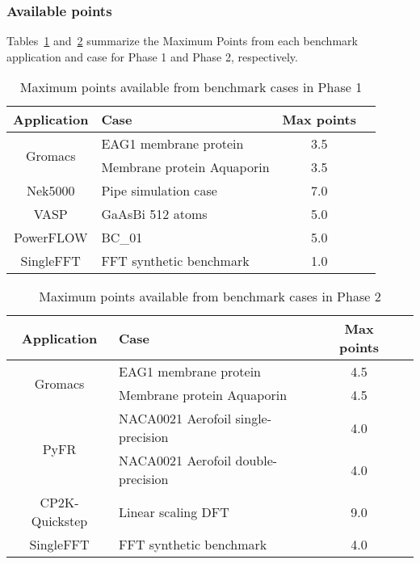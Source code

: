 \documentclass{article}
\begin{document}
\subsubsection*{Available points}

Tables~\ref{tab:points1} and~\ref{tab:points2} summarize the Maximum Points from each benchmark application and case for Phase 1 and Phase 2, respectively.

\begin{table}[h]
\begin{center}
\caption{Maximum points available from benchmark cases in Phase 1}
\label{tab:points1}
\begin{tabular}{cp{6cm}cc}
\hline\hline
\textbf{Application} & \textbf{Case} & \textbf{Max points}\\
\hline
\multirow{2}{*}{Gromacs}&EAG1 membrane protein&3.5\\
& Membrane protein Aquaporin & 3.5 \\ \hline
Nek5000 & Pipe simulation case & 7.0 \\ \hline
VASP & GaAsBi 512 atoms & 5.0 \\ \hline
PowerFLOW & BC\_01 & 5.0 \\ \hline
SingleFFT & FFT synthetic benchmark & 1.0 \\
\hline\hline
\end{tabular}
\end{center}
\end{table}

\begin{table}[h]
\begin{center}
\caption{Maximum points available from benchmark cases in Phase 2}
\label{tab:points2}
\begin{tabular}{cp{6cm}cc}
\hline\hline
\textbf{Application} & \textbf{Case} & \textbf{Max points}\\
\hline
\multirow{2}{*}{Gromacs}&EAG1 membrane protein&4.5\\
& Membrane protein Aquaporin & 4.5 \\ \hline
\multirow{2}{*}{PyFR} & NACA0021 Aerofoil single-precision & 4.0 \\ 
& NACA0021 Aerofoil double-precision & 4.0 \\ \hline 
CP2K-Quickstep & Linear scaling DFT & 9.0 \\ \hline
SingleFFT & FFT synthetic benchmark & 4.0 \\
\hline\hline
\end{tabular}
\end{center}
\end{table}
\end{document}
